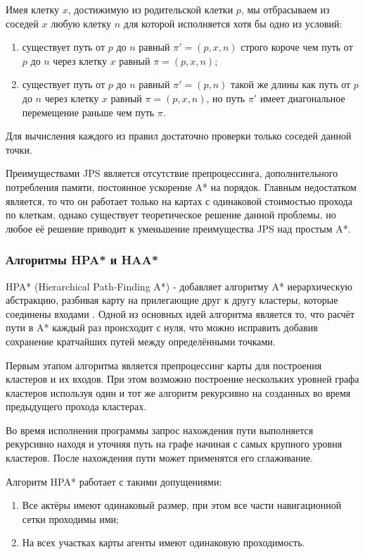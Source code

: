 Имея клетку $x$, достижимую из родительской клетки $p$, мы отбрасываем из соседей $x$ любую клетку $n$ для которой исполняется хотя бы одно из условий:

\begin{enumerate}
	\item существует путь от $p$ до $n$ равный $\pi'=(p,x,n)$ строго короче чем путь от $p$ до $n$ через клетку $x$ равный $\pi=(p,x,n)$;
	\item существует путь от $p$ до $n$ равный $\pi'=(p,n)$ такой же длины как путь от $p$ до $n$ через клетку $x$ равный $\pi=(p,x,n)$, но путь $\pi'$ имеет диагональное перемещение раньше чем путь $\pi$. 
\end{enumerate}

Для вычисления каждого из правил достаточно проверки только соседей данной точки.  

Преимуществами JPS является отсутствие препроцессинга, дополнительного потребления памяти, постоянное ускорение A* на порядок. Главным недостатком является, то что он работает только на картах с одинаковой стоимостью прохода по клеткам, однако существует теоретическое решение данной проблемы, но любое её решение приводит к уменьшение преимущества JPS над простым A*.


\subsubsection{Алгоритмы HPA* и HAA*}

HPA* (Hierarchical Path-Finding A*) - добавляет алгоритму A* иерархическую абстракцию, разбивая карту на прилегающие друг к другу кластеры, которые соединены входами \cite{HPA}. Одной из основных идей алгоритма является то, что расчёт пути в A* каждый раз происходит с нуля, что можно исправить добавив сохранение кратчайших путей между определёнными точками. 

Первым этапом алгоритма является препроцессинг карты для построения кластеров и их входов. При этом возможно построение нескольких уровней графа кластеров используя один и тот же алгоритм рекурсивно на созданных во время предыдущего прохода кластерах.

Во время исполнения программы запрос нахождения пути выполняется рекурсивно находя и уточняя путь на графе начиная с самых крупного уровня кластеров. После нахождения пути может применятся его сглаживание.


Алгоритм HPA* работает с такими допущениями:

\begin{enumerate}
    \item Все актёры имеют одинаковый размер, при этом все части навигационной сетки проходимы ими;
    \item На всех участках карты агенты имеют одинаковую проходимость.
\end{enumerate}

